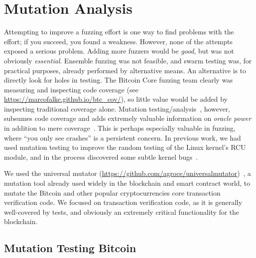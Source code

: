 \section{Mutation Analysis}

Attempting to improve a fuzzing effort is one way to find problems
with the effort; if you succeed, you found a weakness.  However, none
of the attempts exposed a serious problem.  Adding more fuzzers would
be \emph{good}, but was not obviously \emph{essential}.  Ensemble
fuzzing was not feasible, and swarm testing was, for practical
purposes, already performed by alternative means.  An alternative is
to directly look for holes in testing.  The Bitcoin Core fuzzing team
clearly was measuring and inspecting code coverage (see \url{https://marcofalke.github.io/btc_cov/}), so little value
would be added by inspecting traditional coverage alone.  Mutation
testing/analysis~\cite{MutationSurvey,budd1979mutation,demillo1978hints}, however, subsumes code coverage and adds extremely
valuable information on \emph{oracle power} in addition to mere
coverage~\cite{Discontents}.  This is perhaps especially valuable in fuzzing, where ``you
only see crashes'' is a persistent concern.  In previous work, we had
used mutation testing to improve the random testing of the Linux
kernel's RCU module, and in the process discovered some subtle kernel bugs~\cite{mutKernel,groce2018verified}.

\begin{sloppypar}
We used the universal mutator
\noindent(\url{https://github.com/agroce/universalmutator})~\cite{regexpMut}, a
mutation tool already used widely in the blockchain and smart contract world, to
mutate the Bitcoin and other popular cryptocurrencies core transaction
verification code. We focused on transaction verification code, as it is generally well-covered by
tests, and obviously an extremely critical functionality for the blockchain.
\end{sloppypar}

\subsection{Mutation Testing Bitcoin}

